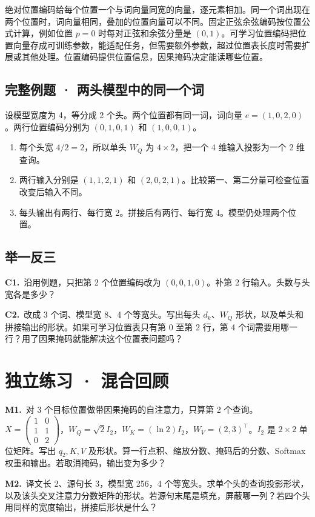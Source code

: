 \documentclass[UTF8,a4paper,11pt]{ctexart}
\newcommand{\PracticeQuestion}[3]{\par\Needspace{4\baselineskip}\noindent\begin{minipage}{\linewidth}\textbf{#1.}\ #2\par\noindent\rule{0pt}{#3mm}\par\end{minipage}\par}
\begin{document}
绝对位置编码给每个位置一个与词向量同宽的向量，逐元素相加。同一个词出现在两个位置时，词向量相同，叠加的位置向量可以不同。固定正弦余弦编码按位置公式计算，例如位置 $p=0$ 时每对正弦和余弦分量是 $(0,1)$。可学习位置编码把位置向量存成可训练参数，能适配任务，但需要额外参数，超过位置表长度时需要扩展或其他处理。位置编码提供位置信息，因果掩码决定能读哪些位置。

\subsection{完整例题 · 两头模型中的同一个词}
设模型宽度为 4，等分成 2 个头。两个位置都有同一词，词向量 $e=(1,0,2,0)$。两行位置编码分别为 $(0,1,0,1)$ 和 $(1,0,0,1)$。

\begin{enumerate}
\item 每个头宽 $4/2=2$，所以单头 $W_Q$ 为 $4\times2$，把一个 4 维输入投影为一个 2 维查询。
\item 两行输入分别是 $(1,1,2,1)$ 和 $(2,0,2,1)$。比较第一、第二分量可检查位置改变后输入不同。
\item 每头输出有两行、每行宽 2。拼接后有两行、每行宽 4。模型仍处理两个位置。
\end{enumerate}
\subsection{举一反三}
\PracticeQuestion{C1}{沿用例题，只把第 2 个位置编码改为 $(0,0,1,0)$。补第 2 行输入。头数与头宽各是多少？}{27}
\PracticeQuestion{C2}{改成 3 个词、模型宽 8、4 个等宽头。写出每头 $d_k$、$W_Q$ 形状，以及单头和拼接输出的形状。如果可学习位置表只有第 0 至第 2 行，第 4 个词需要用哪一行？用了因果掩码就能解决这个位置表问题吗？}{35}
\clearpage
\section{独立练习 · 混合回顾}
\PracticeQuestion{M1}{对 3 个目标位置做带因果掩码的自注意力，只算第 2 个查询。$X=\begin{pmatrix}1&0\\1&1\\0&2\end{pmatrix}$，$W_Q=\sqrt{2}I_2$，$W_K=(\ln2)I_2$，$W_V=(2,3)^\top$。$I_2$ 是 $2\times2$ 单位矩阵。写出 $q_2,K,V$ 及形状。算一行点积、缩放分数、掩码后的分数、Softmax 权重和输出。若取消掩码，输出变为多少？}{86}
\PracticeQuestion{M2}{译文长 2、源句长 3，模型宽 256，4 个等宽头。求单个头的查询投影形状，以及该头交叉注意力分数矩阵的形状。若源句末尾是填充，屏蔽哪一列？若四个头用同样的宽度输出，拼接后形状是什么？}{34}
\clearpage
\end{document}
